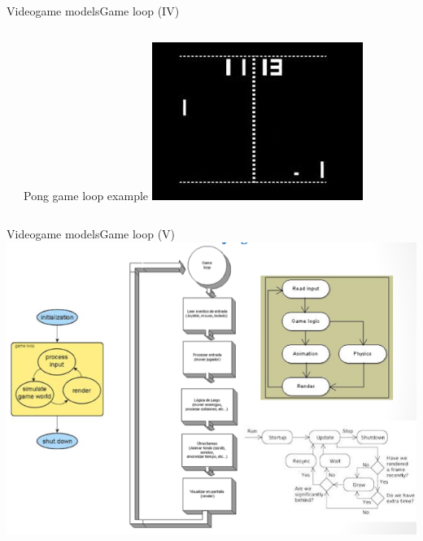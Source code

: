 \documentclass[10pt,compress]{beamer} %
\begin{document}
\begin{frame}{Videogame models}{Game loop (IV)}
	    \vspace{-0.3cm}
    \begin{columns}
    \begin{block}{}
	    \vspace{-0.2cm}
	    
		\vspace{-0.2cm}
	\end{block}
   	Pong game loop example
	\centering\includegraphics[width=\linewidth]{figs/pong.jpeg}
	\end{columns}
\end{frame}

\begin{frame}[plain]{Videogame models}{Game loop (V)}
	\centering\includegraphics[width=\linewidth]{figs/gameloops}
\end{frame}
\end{document}
